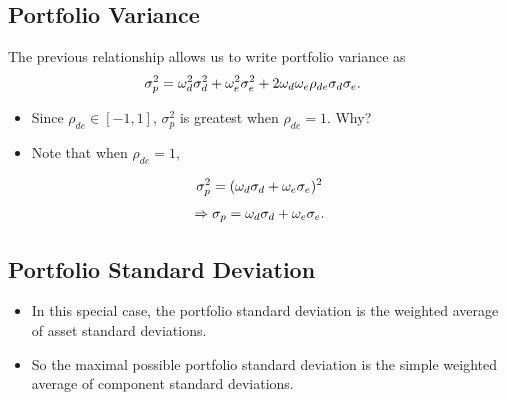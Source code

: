 \documentclass[letterpaper,10pt,english]{sphinxmanual}
\begin{document}
\subsection{Portfolio Variance}
\label{portfolioOpt:portfolio-variance}
The previous relationship allows us to write portfolio variance as
\begin{gather}
\begin{split}\sigma^2_p & = \omega^2_d \sigma^2_d + \omega^2_e \sigma^2_e + 2
\omega_d \omega_e \rho_{de} \sigma_d \sigma_e.\end{split}\notag
\end{gather}\begin{itemize}
\item {} 
Since $\rho_{de} \in [-1,1]$, $\sigma^2_p$ is greatest
when $\rho_{de} = 1$.  Why?

\end{itemize}
\begin{itemize}
\item {} 
Note that when $\rho_{de} = 1$,

\end{itemize}
\begin{gather}
\begin{split}\sigma^2_p = (\omega_d \sigma_d + \omega_e \sigma_e)^2\end{split}\notag
\end{gather}\begin{gather}
\begin{split}\Rightarrow \sigma_p = \omega_d \sigma_d + \omega_e \sigma_e.\end{split}\notag
\end{gather}

\subsection{Portfolio Standard Deviation}
\label{portfolioOpt:portfolio-standard-deviation}\begin{itemize}
\item {} 
In this special case, the portfolio standard deviation is the
weighted average of asset standard deviations.

\end{itemize}
\begin{itemize}
\item {} 
So the maximal possible portfolio standard deviation is the
simple weighted average of component standard deviations.

\end{itemize}
\end{document}
